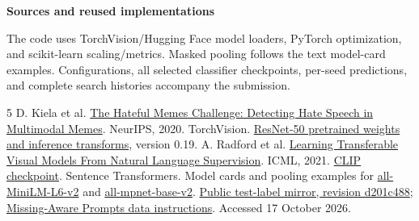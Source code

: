 \documentclass[10pt,a4paper]{article}
\newcommand{\sect}[1]{\vspace{5pt}\textbf{#1}\par\vspace{1pt}}
\begin{document}
\sect{Sources and reused implementations}
The code uses TorchVision/Hugging Face model loaders, PyTorch optimization, and
scikit-learn scaling/metrics. Masked pooling follows the text model-card examples.
Configurations, all selected
classifier checkpoints, per-seed predictions, and complete search histories accompany
the submission.
{\small
\begin{thebibliography}{5}
\setlength{\itemsep}{0pt}\setlength{\parskip}{0pt}
 D. Kiela et al. \href{https://arxiv.org/abs/2005.04790}{The Hateful Memes Challenge: Detecting Hate Speech in Multimodal Memes}. NeurIPS, 2020.
 TorchVision. \href{https://docs.pytorch.org/vision/0.19/models/generated/torchvision.models.resnet50.html}{ResNet-50 pretrained weights and inference transforms}, version 0.19.
 A. Radford et al. \href{https://arxiv.org/abs/2103.00020}{Learning Transferable Visual Models From Natural Language Supervision}. ICML, 2021. \href{https://huggingface.co/openai/clip-vit-base-patch32}{CLIP checkpoint}.
 Sentence Transformers. Model cards and pooling examples for \href{https://huggingface.co/sentence-transformers/all-MiniLM-L6-v2}{all-MiniLM-L6-v2} and \href{https://huggingface.co/sentence-transformers/all-mpnet-base-v2}{all-mpnet-base-v2}.
 \href{https://huggingface.co/datasets/neuralcatcher/hateful_memes/blob/d201c488dc7024623d1ecbcc987b3f132c4c2e12/test_seen.jsonl}{Public test-label mirror, revision d201c488}; \href{https://github.com/YiLunLee/missing_aware_prompts/blob/9aa538159f4623de1936d25daee880ec47c062be/DATA.md}{Missing-Aware Prompts data instructions}. Accessed 17 October 2026.
\end{thebibliography}
}
\end{document}
